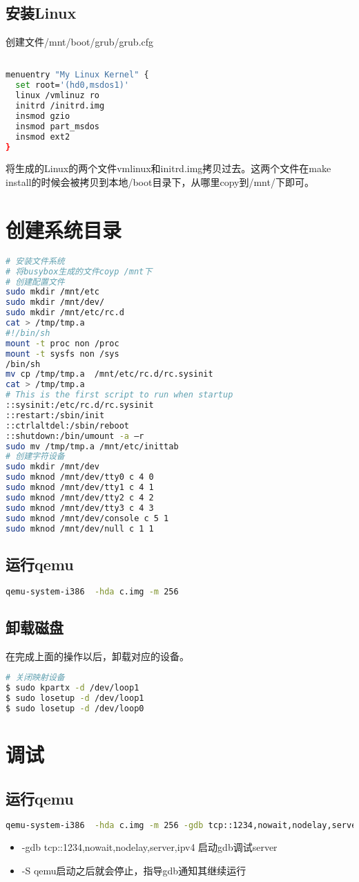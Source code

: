 \documentclass[b5paper,9pt,twoside,openany]{article}
\begin{document}
\subsection{安装Linux}
创建文件/mnt/boot/grub/grub.cfg
\begin{lstlisting}[language=bash]

menuentry "My Linux Kernel" {
  set root='(hd0,msdos1)'
  linux /vmlinuz ro
  initrd /initrd.img
  insmod gzio
  insmod part_msdos
  insmod ext2
}
\end{lstlisting}

将生成的Linux的两个文件vmlinux和initrd.img拷贝过去。这两个文件在make install的时候会被拷贝到本地/boot目录下，从哪里copy到/mnt/下即可。

\section{创建系统目录}
\begin{lstlisting}[language=bash]
# 安装文件系统
# 将busybox生成的文件coyp /mnt下
# 创建配置文件
sudo mkdir /mnt/etc
sudo mkdir /mnt/dev/
sudo mkdir /mnt/etc/rc.d
cat > /tmp/tmp.a
#!/bin/sh
mount -t proc non /proc
mount -t sysfs non /sys
/bin/sh
mv cp /tmp/tmp.a  /mnt/etc/rc.d/rc.sysinit
cat > /tmp/tmp.a
# This is the first script to run when startup
::sysinit:/etc/rc.d/rc.sysinit
::restart:/sbin/init
::ctrlaltdel:/sbin/reboot
::shutdown:/bin/umount -a –r
sudo mv /tmp/tmp.a /mnt/etc/inittab
# 创建字符设备
sudo mkdir /mnt/dev
sudo mknod /mnt/dev/tty0 c 4 0
sudo mknod /mnt/dev/tty1 c 4 1
sudo mknod /mnt/dev/tty2 c 4 2
sudo mknod /mnt/dev/tty3 c 4 3
sudo mknod /mnt/dev/console c 5 1
sudo mknod /mnt/dev/null c 1 1
\end{lstlisting}

\subsection{运行qemu}
\begin{lstlisting}[language=bash]
qemu-system-i386  -hda c.img -m 256
\end{lstlisting}

\subsection{卸载磁盘}
在完成上面的操作以后，卸载对应的设备。
\begin{lstlisting}[language=bash]
# 关闭映射设备
$ sudo kpartx -d /dev/loop1
$ sudo losetup -d /dev/loop1
$ sudo losetup -d /dev/loop0
\end{lstlisting}

\section{调试}
\subsection{运行qemu}
\begin{lstlisting}[language=bash]
qemu-system-i386  -hda c.img -m 256 -gdb tcp::1234,nowait,nodelay,server,ipv4 -S
\end{lstlisting}
\begin{itemize}
\item -gdb tcp::1234,nowait,nodelay,server,ipv4 启动gdb调试server
\item -S qemu启动之后就会停止，指导gdb通知其继续运行
\end{itemize}
\end{document}
